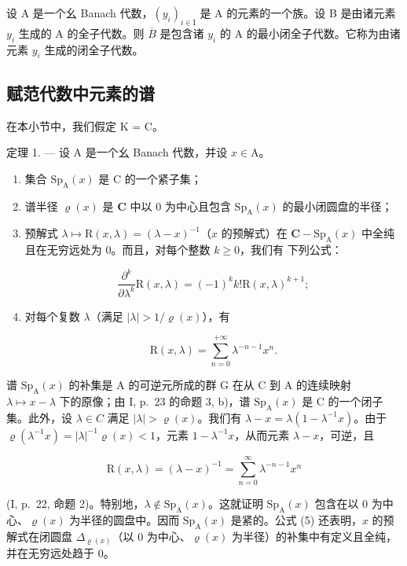 设 A 是一个幺 Banach 代数，\((y_{i})_{i\in\mathrm{I}}\) 是 A 的元素的一个族。设 B 是由诸元素 \(y_{i}\) 生成的 A 的全子代数。则 \(\overline{B}\) 是包含诸 \(y_{i}\) 的 A 的最小闭全子代数。它称为由诸元素 \(y_{i}\) 生成的闭全子代数。

\subsection{赋范代数中元素的谱}

在本小节中，我们假定 K = C。

定理 1. --- 设 A 是一个幺 Banach 代数，并设 \(x \in \mathrm{A}\)。

\begin{enumerate}
\def\labelenumi{\alph{enumi})}
\item
  集合 \(\mathrm{Sp}_{\mathrm{A}}(x)\) 是 C 的一个紧子集；
\item
  谱半径 \(\varrho(x)\) 是 \(\mathbf{C}\) 中以 0 为中心且包含 \(\mathrm{Sp}_{\mathrm{A}}(x)\) 的最小闭圆盘的半径；
\item
  预解式 \(\lambda \mapsto \mathrm{R}(x,\lambda) = (\lambda -x)^{-1}\)（\(x\) 的预解式）在 \(\mathbf{C} - \mathrm{Sp}_{\mathrm{A}}(x)\) 中全纯且在无穷远处为 0。而且，对每个整数 \(k\geqslant 0\)，我们有
下列公式：

\[
\frac {\partial^ {k}}{\partial \lambda^ {k}} \mathrm{R} (x, \lambda) = (- 1) ^ {k} k! \mathrm{R} (x, \lambda) ^ {k + 1};
\]

\item
  对每个复数 \(\lambda\)（满足 \(|\lambda| > 1 / \varrho(x)\)），有

\[
\mathrm{R} (x, \lambda) = \sum_ {n = 0} ^ {+ \infty} \lambda^ {- n - 1} x ^ {n}.
\]

\end{enumerate}

谱 \(\mathrm{Sp}_{\mathrm{A}}(x)\) 的补集是 A 的可逆元所成的群 G 在从 C 到 A 的连续映射 \(\lambda \mapsto x - \lambda\) 下的原像；由 I, p.~23 的命题 3, b)，谱 \(\mathrm{Sp}_{\mathrm{A}}(x)\) 是 C 的一个闭子集。此外，设 \(\lambda \in C\) 满足 \(|\lambda| > \varrho(x)\)。我们有 \(\lambda - x = \lambda(1 - \lambda^{-1}x)\)。由于 \(\varrho(\lambda^{-1}x) = |\lambda|^{-1}\varrho(x) < 1\)，元素 \(1 - \lambda^{-1}x\)，从而元素 \(\lambda - x\)，可逆，且

\[
\mathrm{R} (x, \lambda) = (\lambda - x) ^ {- 1} = \sum_ {n = 0} ^ {\infty} \lambda^ {- n - 1} x ^ {n}\tag{5}
\]

(I, p.~22, 命题 2)。特别地，\(\lambda \notin \mathrm{Sp}_{\mathrm{A}}(x)\)。这就证明 \(\mathrm{Sp}_{\mathrm{A}}(x)\) 包含在以 0 为中心、\(\varrho(x)\) 为半径的圆盘中。因而 \(\mathrm{Sp}_{\mathrm{A}}(x)\) 是紧的。公式 (5) 还表明，\(x\) 的预解式在闭圆盘 \(\Delta_{\varrho(x)}\)（以 0 为中心、\(\varrho(x)\) 为半径）的补集中有定义且全纯，并在无穷远处趋于 0。

